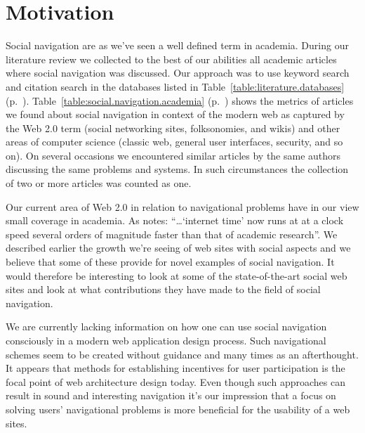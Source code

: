\section{Motivation}

Social navigation are as we've seen a well defined term in academia. During
our literature review we collected to the best of our abilities all academic
articles where social navigation was discussed. Our approach was to use
keyword search and citation search in the databases listed in
Table~\ref{table:literature.databases}
(p.~\pageref{table:literature.databases}).
Table~\ref{table:social.navigation.academia}
(p.~\pageref{table:social.navigation.academia}) shows the metrics of articles
we found about social navigation in context of the modern web as captured by
the Web 2.0 term (social networking sites, folksonomies, and wikis) and other
areas of computer science (classic web, general user interfaces, security, and
so on).
On several occasions we encountered similar articles by the same authors
discussing the same problems and systems. In such circumstances the collection
of two or more articles was counted as one.

Our current area of Web 2.0 in relation to navigational problems have in our
view small coverage in academia.
As \citet{beer07} notes: ``\ldots `internet time' now runs at at a clock speed
several orders of magnitude faster than that of academic research''.
We described earlier the growth we're seeing of web sites with social
aspects and we believe that some of these provide for novel examples of social
navigation. It would therefore be interesting to look at some of the
state-of-the-art social web sites and look at what contributions they have
made to the field of social navigation.


We are currently lacking information on how one can use social navigation
consciously in a modern web application design process. Such navigational
schemes seem to be created without guidance and many times as an afterthought.
It appears that methods for establishing incentives for user participation
is the focal point of web architecture design today. Even though such
approaches can result in sound and interesting navigation it's our impression
that a focus on solving users' navigational problems is more beneficial for
the usability of a web sites.

